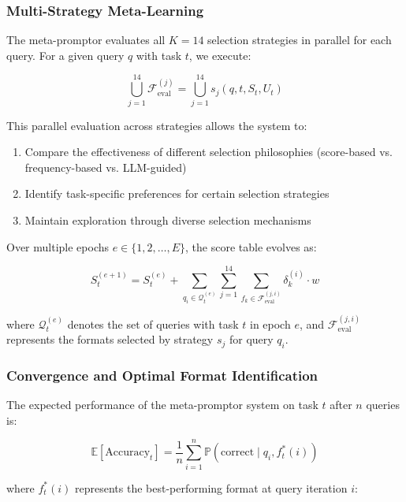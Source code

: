 \subsubsection{Multi-Strategy Meta-Learning}

The meta-promptor evaluates all $K = 14$ selection strategies in parallel for each query. For a given query $q$ with task $t$, we execute:

\begin{equation}
\bigcup_{j=1}^{14} \mathcal{F}_{\text{eval}}^{(j)} = \bigcup_{j=1}^{14} s_j(q, t, S_t, U_t)
\end{equation}

This parallel evaluation across strategies allows the system to:
\begin{enumerate}
    \item Compare the effectiveness of different selection philosophies (score-based vs. frequency-based vs. LLM-guided)
    \item Identify task-specific preferences for certain selection strategies
    \item Maintain exploration through diverse selection mechanisms
\end{enumerate}

Over multiple epochs $e \in \{1, 2, \ldots, E\}$, the score table evolves as:

\begin{equation}
S_t^{(e+1)} = S_t^{(e)} + \sum_{q_i \in \mathcal{Q}_t^{(e)}} \sum_{j=1}^{14} \sum_{f_k \in \mathcal{F}_{\text{eval}}^{(j,i)}} \delta_k^{(i)} \cdot w
\end{equation}

where $\mathcal{Q}_t^{(e)}$ denotes the set of queries with task $t$ in epoch $e$, and $\mathcal{F}_{\text{eval}}^{(j,i)}$ represents the formats selected by strategy $s_j$ for query $q_i$.

\subsubsection{Convergence and Optimal Format Identification}

The expected performance of the meta-promptor system on task $t$ after $n$ queries is:

\begin{equation}
\mathbb{E}[\text{Accuracy}_t] = \frac{1}{n} \sum_{i=1}^n \mathbb{P}(\text{correct} \mid q_i, f^*_t(i))
\end{equation}

where $f^*_t(i)$ represents the best-performing format at query iteration $i$:

